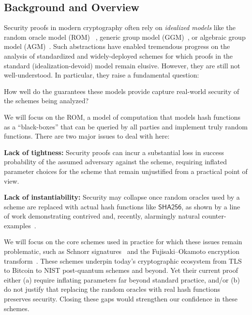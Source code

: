 \subsection{Background and Overview}
Security proofs in  modern cryptography often rely on \emph{idealized models} like the random oracle model (ROM) ~\cite{CCS:BelRog93},  generic group model (GGM)~\cite{EC:Shoup97}, or algebraic group model (AGM)~\cite{C:FucKilLos18}. Such abstractions have enabled tremendous progress on the analysis of standardized and widely-deployed schemes for which proofs in the standard (idealization-devoid) model remain elusive. However, they are still not well-understood. In particular, they raise a fundamental question:
\begin{ques}
How well do the guarantees these  models  provide capture real-world security of the schemes being analyzed?
\end{ques}
We will focus on the ROM, a model of computation that models  hash functions as a ``black-boxes'' that can be queried by all parties and implement truly random functions. There are two major issues to deal with here:
\begin{newenum}
    \item \textbf{Lack of tightness:} Security proofs can incur a substantial loss in  success probability of the assumed adversary against the scheme,  requiring  inflated parameter choices for the scheme that remain  unjustified from a practical point of view. %
    \item \textbf{Lack of instantiability:} Security may collapse once random oracles  used by a scheme are replaced with actual hash functions like $\mathsf{SHA256}$, as shown by a line of work demonstrating contrived and, recently, alarmingly natural counter-examples~\cite{C:FieLan25,KRS25}.
\end{newenum}
We will focus on the core schemes used in practice for which these issues remain problematic, such as Schnorr signatures~\cite{C:Schnorr89}  and the Fujisaki–Okamoto encryption transform~\cite{JC:FujOka13}. These schemes underpin today's cryptographic ecosystem from TLS to  Bitcoin to NIST post-quantum schemes and beyond. Yet their current proof either (a) require inflating  parameters far beyond standard practice, and/or (b) do not justify that replacing the random oracles with real hash functions preserves security. Closing these gaps would strengthen our confidence in these schemes.  %

